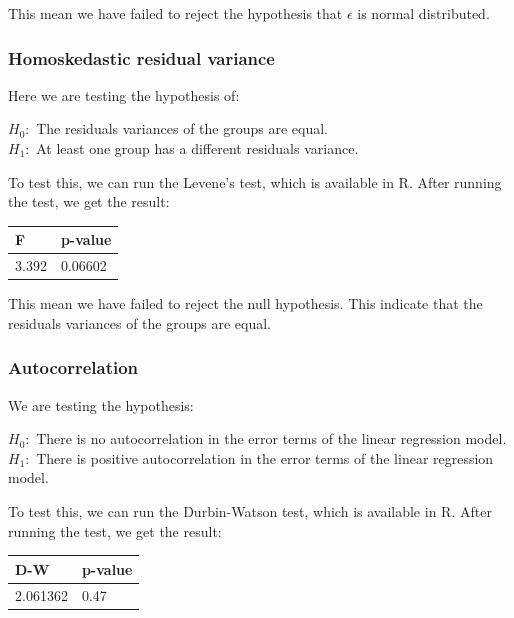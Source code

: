 This mean we have failed to reject the hypothesis that $\epsilon$ is normal distributed. 

\subsubsection{Homoskedastic residual variance}

Here we are testing the hypothesis of:

\begin{center}
    $H_0:$ The residuals variances of the groups are equal.
    \\
    $H_1:$ At least one group has a different residuals variance.
\end{center}

To test this, we can run the Levene's test, which is available in R. After running the test, we get the result:

\begin{table}[H]
\centering
{}
\begin{tabular}{ll}
  \hline
                F             & p-value    \\
    \hline
        3.392 &  0.06602   \\

   \hline
\end{tabular}
\label{tab:vif}
\end{table}

This mean we have failed to reject the null hypothesis. This indicate that the residuals variances of the groups are equal.

\subsubsection{Autocorrelation}

We are testing the hypothesis:

\begin{center}
    $H_0:$ There is no autocorrelation in the error terms of the linear regression model.
    \\
    $H_1:$ There is positive autocorrelation in the error terms of the linear regression model.
\end{center}

To test this, we can run the Durbin-Watson test, which is available in R. After running the test, we get the result:

\begin{table}[H]
\centering
{}
\begin{tabular}{ll}
  \hline
                D-W             & p-value    \\
    \hline
        2.061362  & 0.47   \\

   \hline
\end{tabular}
\label{tab:vif}
\end{table}

